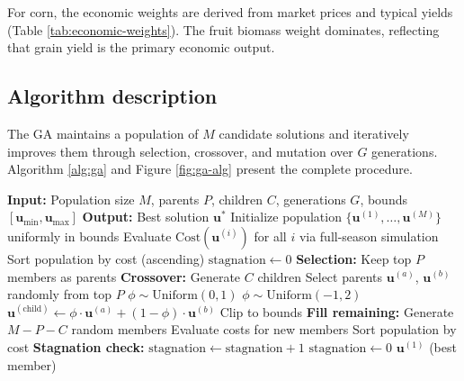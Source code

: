 \documentclass[preprint,12pt]{elsarticle}
\begin{document}
For corn, the economic weights are derived from market prices and typical yields (Table \ref{tab:economic-weights}). The fruit biomass weight dominates, reflecting that grain yield is the primary economic output.

\subsection{Algorithm description}\label{subsec:ga-algorithm}

The GA maintains a population of $M$ candidate solutions and iteratively improves them through selection, crossover, and mutation over $G$ generations. Algorithm \ref{alg:ga} and Figure \ref{fig:ga-alg} present the complete procedure.

\begin{algorithm}[h]
\caption{Genetic Algorithm for Input Optimization}
\label{alg:ga}
\begin{algorithmic}[1]
\State \textbf{Input:} Population size $M$, parents $P$, children $C$, generations $G$, bounds $[\mathbf{u}_{\min}, \mathbf{u}_{\max}]$
\State \textbf{Output:} Best solution $\mathbf{u}^{*}$
\State
\State Initialize population $\{\mathbf{u}^{(1)}, \ldots, \mathbf{u}^{(M)}\}$ uniformly in bounds
\State Evaluate $\text{Cost}(\mathbf{u}^{(i)})$ for all $i$ via full-season simulation
\State Sort population by cost (ascending)
\State $\text{stagnation} \gets 0$
\State
{}
    \State \textbf{Selection:} Keep top $P$ members as parents
    \State
    \State \textbf{Crossover:} Generate $C$ children
        \State Select parents $\mathbf{u}^{(a)}$, $\mathbf{u}^{(b)}$ randomly from top $P$
            \State $\phi \sim \text{Uniform}(0, 1)$
        \Else
            \State $\phi \sim \text{Uniform}(-1, 2)$ 
        \EndIf
        \State $\mathbf{u}^{(\text{child})} \gets \phi \cdot \mathbf{u}^{(a)} + (1 - \phi) \cdot \mathbf{u}^{(b)}$
        \State Clip to bounds
    \EndFor
    \State
    \State \textbf{Fill remaining:} Generate $M - P - C$ random members
    \State Evaluate costs for new members
    \State Sort population by cost
    \State
    \State \textbf{Stagnation check:}
        \State $\text{stagnation} \gets \text{stagnation} + 1$
    \Else
        \State $\text{stagnation} \gets 0$
    \EndIf
\EndFor
\State
\State \Return $\mathbf{u}^{(1)}$ (best member)
\end{algorithmic}
\end{algorithm}
\end{document}
